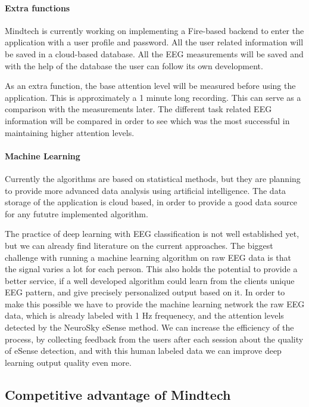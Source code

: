 \documentclass[letterpaper,10pt]{article}
\let\oldsubsection\subsection
\renewcommand{\subsection}{\def\cursectioning{subsection}\oldsubsection}
\begin{document}
\paragraph{Extra functions}
Mindtech is currently working on implementing a Fire-based backend to enter the application with a user profile and password. All the user related information will be saved in a cloud-based database. All the EEG measurements will be saved and with the help of the database the user can follow its own development. 

As an extra function, the base attention level will be measured before using the application. This is approximately a 1 minute long recording. This can serve as a comparison with the measurements later. The different task related EEG information will be compared in order to see which was the most successful in maintaining higher attention levels.


\paragraph{Machine Learning}
Currently the algorithms are based on statistical methods, but they are planning to provide more advanced data analysis using artificial intelligence.
The data storage of the application is cloud based, in order to provide a good data source for any fututre implemented algorithm.

The practice of deep learning with EEG classification is not well established yet, but we can already find literature on the current approaches. The biggest challenge with running a machine learning algorithm on raw EEG data is that the signal varies a lot for each person. This also holds the potential to provide a better service, if a well developed algorithm could learn from the clients unique EEG pattern, and give precisely personalized output based on it.
In order to make this possible we have to provide the machine learning network the raw EEG data, which is already labeled with 1 Hz frequenecy, and the attention levels detected by the NeuroSky eSense method. We can increase the efficiency of the process, by collecting feedback from the users after each session about the quality of eSense detection, and with this human labeled data we can improve deep learning output quality even more.

\subsection{Competitive advantage of Mindtech}
\end{document}

